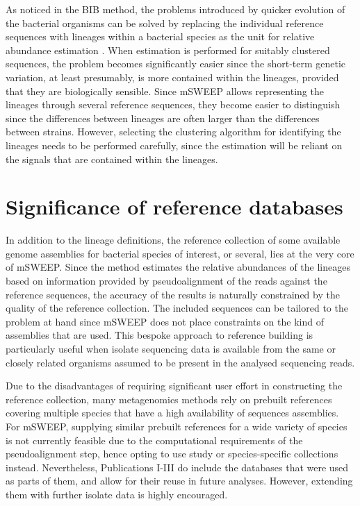 \documentclass[officiallayout]{tktla}
\begin{document}
As noticed in the BIB method, the problems introduced by quicker
evolution of the bacterial organisms can be solved by replacing the
individual reference sequences with lineages within a bacterial
species as the unit for relative abundance estimation
\citep{sankar2016bayesian}. When estimation is performed for suitably
clustered sequences, the problem becomes significantly easier since
the short-term genetic variation, at least presumably, is more
contained within the lineages, provided that they are biologically
sensible. Since mSWEEP allows representing the lineages through
several reference sequences, they become easier to distinguish since
the differences between lineages are often larger than the differences
between strains. However, selecting the clustering algorithm for
identifying the lineages needs to be performed carefully, since the
estimation will be reliant on the signals that are contained within
the lineages.

\section{Significance of reference databases}

In addition to the lineage definitions, the reference collection of
some available genome assemblies for  bacterial species of interest,
or several, lies at the very core of mSWEEP. Since the method
estimates the relative abundances of the lineages based on information
provided by pseudoalignment of the reads against the reference
sequences, the accuracy of the results is naturally constrained by the
quality of the reference collection. The included sequences can be
tailored to the problem at hand since mSWEEP does not place
constraints on the kind of assemblies that are used. This bespoke
approach to reference building is particularly useful when isolate
sequencing data is available from the same or closely related
organisms assumed to be present in the analysed sequencing reads.

Due to the disadvantages of requiring significant user effort in
constructing the reference collection, many metagenomics methods rely
on prebuilt references covering multiple species that have a high
availability of sequences assemblies. For mSWEEP, supplying similar
prebuilt references for a wide variety of species is not currently
feasible due to the computational requirements of the pseudoalignment
step, hence opting to use study or species-specific collections
instead. Nevertheless, Publications I-III do include the databases
that were used as parts of them, and allow for their reuse in future
analyses. However, extending them with further isolate data is highly
encouraged.
\end{document}
